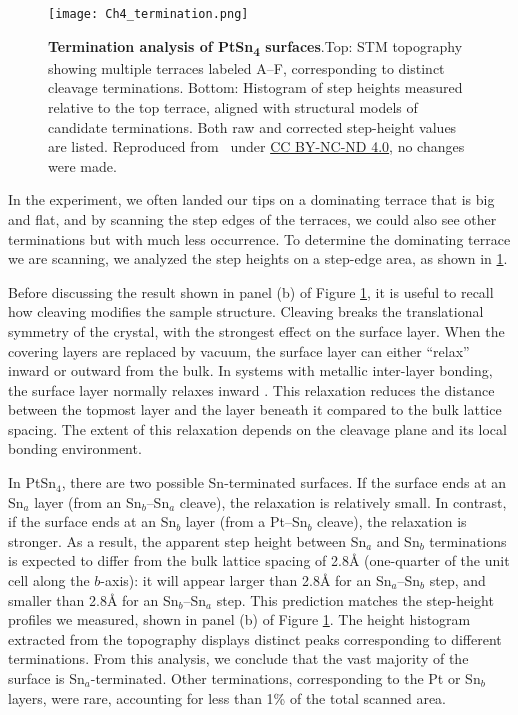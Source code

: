 \begin{figure}
	\centering
	\texttt{[image: Ch4\_termination.png]}
	\caption[\textbf{Termination analysis of PtSn\textsubscript{4} surfaces}]{\textbf{Termination analysis of PtSn\textsubscript{4} surfaces}.Top: STM topography showing multiple terraces labeled A–F, corresponding to distinct cleavage terminations.
	Bottom: Histogram of step heights measured relative to the top terrace, aligned with structural models of candidate terminations. Both raw and corrected step-height values are listed. Reproduced from~\cite{warnerDefectTerraceCharacterization2022} under
	\href{https://creativecommons.org/licenses/by-nc-nd/4.0/}{CC BY-NC-ND 4.0}, no changes were made. }
	\label{fig:ch4_termination}
\end{figure}

\par In the experiment, we often landed our tips on a dominating terrace that is big and flat, and by scanning the step edges of the terraces, we could also see other terminations but with much less occurrence. To determine the dominating terrace we are scanning, we analyzed the step heights on a step-edge area, as shown in \ref{fig:ch4_termination}. 

Before discussing the result shown in panel (b) of Figure \ref{fig:ch4_termination}, it is useful to recall how cleaving modifies the sample structure. Cleaving breaks the translational symmetry of the crystal, with the strongest effect on the surface layer. When the covering layers are replaced by vacuum, the surface layer can either “relax” inward or outward from the bulk. In systems with metallic inter-layer bonding, the surface layer normally relaxes inward \cite{okazawaEnhancedCorrelatedThermal2005}. This relaxation reduces the distance between the topmost layer and the layer beneath it compared to the bulk lattice spacing. The extent of this relaxation depends on the cleavage plane and its local bonding environment.

In PtSn$_4$, there are two possible Sn-terminated surfaces. If the surface ends at an Sn$_a$ layer (from an Sn$_b$–Sn$_a$ cleave), the relaxation is relatively small. In contrast, if the surface ends at an Sn$_b$ layer (from a Pt–Sn$_b$ cleave), the relaxation is stronger. As a result, the apparent step height between Sn$_a$ and Sn$_b$ terminations is expected to differ from the bulk lattice spacing of 2.8{\AA} (one-quarter of the unit cell along the $b$-axis): it will appear larger than 2.8{\AA} for an Sn$_a$–Sn$_b$ step, and smaller than 2.8{\AA} for an Sn$_b$–Sn$_a$ step. This prediction matches the step-height profiles we measured, shown in panel (b) of Figure \ref{fig:ch4_termination}. The height histogram extracted from the topography displays distinct peaks corresponding to different terminations. From this analysis, we conclude that the vast majority of the surface is Sn$_a$-terminated. Other terminations, corresponding to the Pt or Sn$_b$ layers, were rare, accounting for less than 1\% of the total scanned area.


